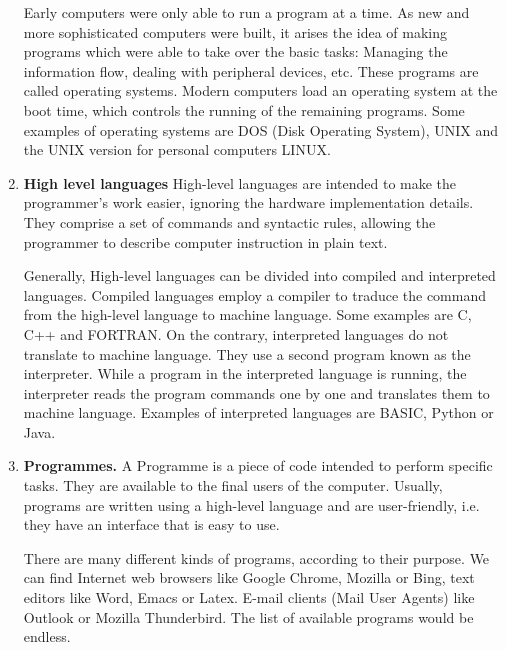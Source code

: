\begin{paracol}{2}
\begin{enumerate}
Early computers were only able to run a program at a time. As new and more sophisticated computers were built, it arises the idea of making programs which were able to take over the basic tasks:
Managing the information flow, dealing with peripheral devices, etc. These programs are called operating systems. Modern computers load an operating system at the boot time, which controls the running of the remaining programs. Some examples of operating systems are DOS (Disk Operating System), UNIX and the UNIX version for personal computers LINUX.       

\item \textbf{High level languages} 
High-level languages are intended to make the programmer's work easier, ignoring the hardware implementation details.   They comprise a set of commands and syntactic rules, allowing the programmer to describe computer instruction in plain text.

Generally, High-level languages can be divided into compiled and interpreted languages. Compiled languages employ a compiler to traduce the command from the high-level language to machine language. Some examples are C, C++ and FORTRAN. On the contrary, interpreted languages do not translate to machine language. They use a second program known as the interpreter. While a program in the interpreted language is running, the interpreter reads the program commands one by one and translates them to machine language. Examples of interpreted languages are BASIC, Python or Java.  


\item \textbf{Programmes.}  
A Programme is a piece of code intended to perform specific tasks. They are available to the final users of the computer. Usually, programs are written using a high-level language and are user-friendly, i.e. they have an interface that is easy to use.

There are many different kinds of programs, according to their purpose. We can find Internet web browsers like Google Chrome, Mozilla or Bing, text editors like Word, Emacs or Latex.    
E-mail clients (Mail User Agents) like Outlook or Mozilla Thunderbird. The list of available programs would be endless. 
\end{enumerate}

\end{paracol}



